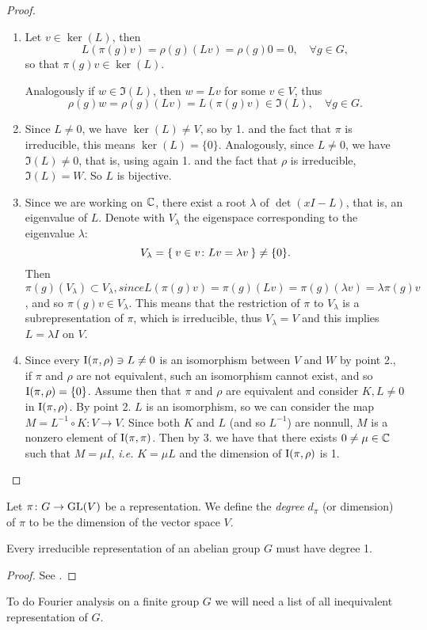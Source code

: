 \begin{proof}
\begin{enumerate}
\item Let $v \in \ker(L)$, then 
\[
L(\pi(g)v)=\rho(g)(Lv)=\rho(g)0=0, \quad \forall g\in G,
\]
so that $\pi(g)v\in \ker(L)$.

Analogously if $w \in \Im(L)$, then $w=Lv$ for some $v\in V$, thus
\[
\rho(g)w=\rho(g)(Lv)=L(\pi(g)v)\in \Im(L), \quad \forall g\in G.
\]


\item Since $L\neq 0$, we have $\ker(L)\neq V$, so by 1. and the fact that $\pi$ is irreducible, this means $\ker(L)=\{0\}$. Analogously, since $L\neq 0$, we have $\Im(L)\neq 0$, that is, using again 1. and the fact that $\rho$ is irreducible, $\Im(L)=W$. So $L$ is bijective.
\item Since we are working on ${\mathbb C}$, there exist a root $\lambda$ of $\det(xI-L)$, that is, an eigenvalue of $L$. Denote with $V_\lambda$ the eigenspace corresponding to the eigenvalue $\lambda$:
\[
V_\lambda=\Set{v\in v \colon Lv=\lambda v}\neq \{0\}.
\] 
Then $\pi(g)(V_\lambda)\subset V_\lambda, since L(\pi(g)v)=\pi(g)(Lv)=\pi(g)(\lambda  v)=\lambda\pi(g) v$, and so $\pi(g)v\in V_\lambda$. This means that the restriction of $\pi$ to $V_\lambda$ is a subrepresentation of $\pi$, which is irreducible, thus $V_\lambda = V$ and this implies $L=\lambda I$ on $V$. 
\item Since every $\operatorname{I}(\pi,\rho)\ni L\neq 0$ is an isomorphism between $V$ and $W$ by point 2., if $\pi$ and $\rho$ are not equivalent, such an isomorphism cannot exist, and so $\operatorname{I}(\pi,\rho)=\{0\}$. Assume then that $\pi$ and $\rho$ are equivalent and consider $K,L\neq 0$ in  $\operatorname{I}(\pi,\rho)$. By point 2. $L$ is an isomorphism, so we can consider the map $M=L^{-1} \circ K\colon V\rightarrow V$. Since both $K$ and $L$ (and so $L^{-1}$) are nonnull, $M$ is a nonzero element of $\operatorname{I}(\pi,\pi)$. Then by 3. we have that there exists $0\neq \mu\in {\mathbb C}$ such that $M=\mu I$, \emph{i.e.} $K=\mu L$ and the dimension of $\operatorname{I}(\pi,\rho)$ is 1.
\end{enumerate}

\end{proof}
\begin{defn}
Let $\pi\colon G \rightarrow \operatorname{GL}(V)$ be a representation. We define the \emph{degree} $d_{\pi}$ (or dimension) of $\pi$ to be the dimension of the vector space $V$.
\end{defn}
\begin{cor}
Every irreducible representation of an abelian group $G$ must have degree 1.
\end{cor}
\begin{proof}
See \cite[p. 249]{terras_1999}.
\end{proof}
To do Fourier analysis on a finite group $G$ we will need a list of all inequivalent representation of $G$.

